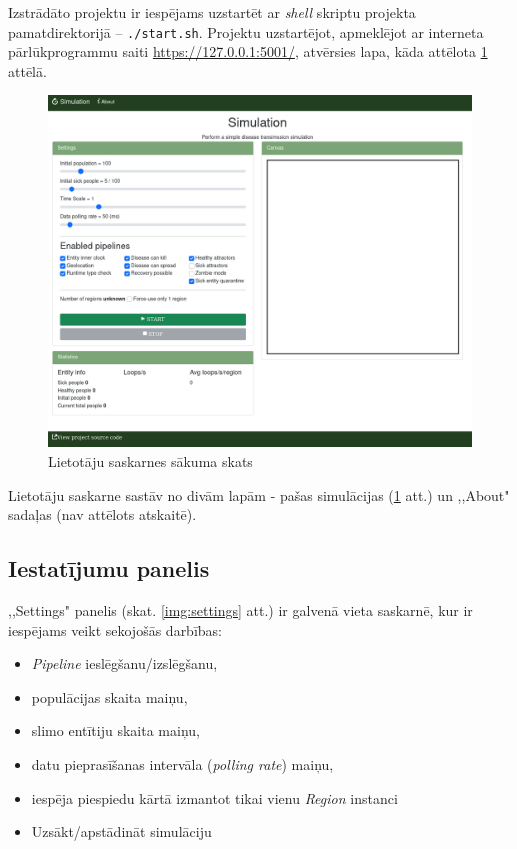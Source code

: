 

Izstrādāto projektu ir iespējams uzstartēt ar \emph{shell} skriptu projekta
pamatdirektorijā -- \texttt{./start.sh}.
Projektu uzstartējot, apmeklējot ar interneta pārlūkprogrammu saiti
\url{https://127.0.0.1:5001/}, atvērsies lapa, kāda attēlota \ref{img:whole-ui} attēlā.

\begin{figure}[H]
	\centering
	\includegraphics[scale=0.4]{images/ui-whole-page.png}
	\caption{Lietotāju saskarnes sākuma skats}
	\label{img:whole-ui}
\end{figure}

Lietotāju saskarne sastāv no divām lapām - pašas simulācijas (\ref{img:whole-ui}
att.) un ,,About" sadaļas (nav attēlots atskaitē).

\subsection{Iestatījumu panelis}

,,Settings" panelis (skat. \ref{img:settings} att.) ir galvenā vieta saskarnē,
kur ir iespējams veikt sekojošās darbības:

\begin{itemize}
    \item \emph{Pipeline} ieslēgšanu/izslēgšanu,
    \item populācijas skaita maiņu,
    \item slimo entītiju skaita maiņu,
    \item datu pieprasīšanas intervāla (\emph{polling rate}) maiņu,
    \item iespēja piespiedu kārtā izmantot tikai vienu \emph{Region} instanci
    \item Uzsākt/apstādināt simulāciju
\end{itemize}


